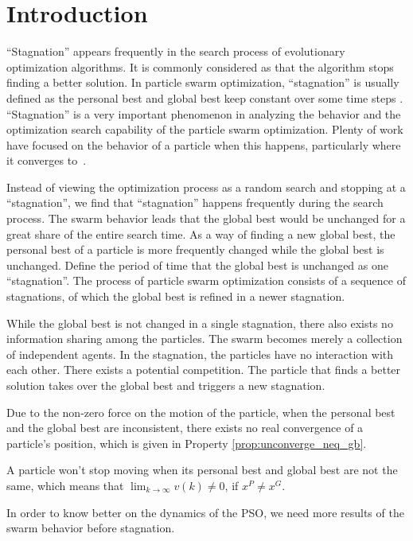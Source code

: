 \section{Introduction}
\label{sec:introduction}

``Stagnation'' appears frequently in the search process of evolutionary optimization algorithms. 
It is commonly considered as that the algorithm stops finding a better solution.
In particle swarm optimization, ``stagnation'' is usually defined as the personal best and global best keep constant over some time steps \cite{4223160}.
``Stagnation'' is a very important phenomenon in analyzing the behavior and the optimization search capability of the particle swarm optimization.
Plenty of work have focused on the behavior of a particle when this happens, particularly where it converges to~\cite{Schmitt:2013:PSO:2463372.2463563}\cite{Poli:2008:DSS:1384929.1384944}.

Instead of viewing the optimization process as a random search and stopping at a ``stagnation'', we find that ``stagnation'' happens frequently during the search process.
The swarm behavior leads that the global best would be unchanged for a great share of the entire search time.
As a way of finding a new global best, the personal best of a particle is more frequently changed while the global best is unchanged. 
Define the period of time that the global best is unchanged as one ``stagnation''.
The process of particle swarm optimization consists of a sequence of stagnations, of which the global best is refined in a newer stagnation.

While the global best is not changed in a single stagnation, there also exists no information sharing among the particles.
The swarm becomes merely a collection of independent agents.
In the stagnation, the particles have no interaction with each other.
There exists a potential competition.
The particle that finds a better solution takes over the global best and triggers a new stagnation.

Due to the non-zero force on the motion of the particle, when the personal best and the global best are inconsistent, there exists no real convergence of a particle's position, which is given in Property \ref{prop:unconverge_neq_gb}.
\begin{myprop}
\label{prop:unconverge_neq_gb}
A particle won't stop moving when its personal best and global best are not the same, 
which means that 
$ \lim_{k \rightarrow \infty} v(k) \neq 0 $, if $ x^{P} \neq x^{G} $.
\end{myprop}
In order to know better on the dynamics of the PSO, we need more results of the swarm behavior before stagnation.